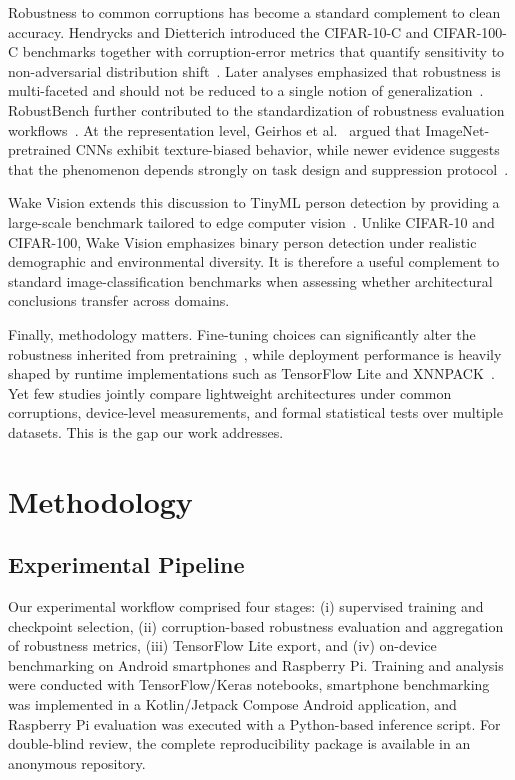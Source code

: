 \documentclass[runningheads]{llncs}
\begin{document}
Robustness to common corruptions has become a standard complement to clean accuracy. Hendrycks and Dietterich introduced the CIFAR-10-C and CIFAR-100-C benchmarks together with corruption-error metrics that quantify sensitivity to non-adversarial distribution shift~\cite{hendrycks2019benchmarking}. Later analyses emphasized that robustness is multi-faceted and should not be reduced to a single notion of generalization~\cite{hendrycks2021manyfaces}. RobustBench further contributed to the standardization of robustness evaluation workflows~\cite{croce2021robustbench}. At the representation level, Geirhos et al.~\cite{geirhos2019texture} argued that ImageNet-pretrained CNNs exhibit texture-biased behavior, while newer evidence suggests that the phenomenon depends strongly on task design and suppression protocol~\cite{burgert2025texture}.

Wake Vision extends this discussion to TinyML person detection by providing a large-scale benchmark tailored to edge computer vision~\cite{banbury2024wakevision}. Unlike CIFAR-10 and CIFAR-100, Wake Vision emphasizes binary person detection under realistic demographic and environmental diversity. It is therefore a useful complement to standard image-classification benchmarks when assessing whether architectural conclusions transfer across domains.

Finally, methodology matters. Fine-tuning choices can significantly alter the robustness inherited from pretraining~\cite{hwang2024pretraining}, while deployment performance is heavily shaped by runtime implementations such as TensorFlow Lite and XNNPACK~\cite{tensorflowlite,dukhan2021xnnpack}. Yet few studies jointly compare lightweight architectures under common corruptions, device-level measurements, and formal statistical tests over multiple datasets. This is the gap our work addresses.

\section{Methodology}
\label{sec:method}
\subsection{Experimental Pipeline}
Our experimental workflow comprised four stages: (i) supervised training and
checkpoint selection, (ii) corruption-based robustness evaluation and
aggregation of robustness metrics, (iii) TensorFlow Lite export, and (iv)
on-device benchmarking on Android smartphones and Raspberry Pi. Training and
analysis were conducted with TensorFlow/Keras notebooks, smartphone
benchmarking was implemented in a Kotlin/Jetpack Compose Android application,
and Raspberry Pi evaluation was executed with a Python-based inference script.
For double-blind review, the complete reproducibility package is available in
an anonymous repository.
\end{document}
